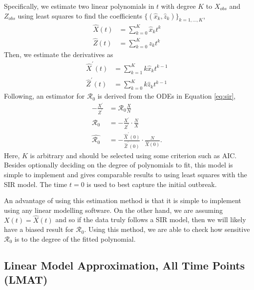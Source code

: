 \documentclass[12pt]{article}
\newcommand{\rr}{\ensuremath{\mathcal{R}_0}}
\begin{document}
Specifically, we estimate two linear polynomials in \(t\) with degree $K$  to \(X_{obs}\)
and \(Z_{obs}\) using least squares to find the coefficients $\{(\hat{x}_k,
\hat{z}_k)\}_{k=1, \dots, K}$,
\begin{align*}
\hat{X}(t) &= \sum_{k=0}^K \hat{x}_k t^k\\
{\hat{Z}}(t) &= \sum_{k=0}^K \hat{z}_k t^k
\end{align*}
Then, we estimate the derivatives as
\begin{align*}
\hat{X}^\prime(t) &= \sum_{k=1}^K k \hat{x}_k t^{k-1}\\
\hat{Z}^\prime(t) &= \sum_{k=0}^K k \hat{z}_k t^{k-1}
\end{align*}
Following,  an estimator for \(\rr\) is derived from the ODEs in Equation \eqref{eq:sir},
\begin{align}
  - \frac{X^\prime}{Z^\prime}&= \rr \frac{X}{N} \nonumber\\
  \rr &=       -\frac{X^\prime}{
        Z^\prime} \cdot \frac{N}{X} \nonumber\\
  \hat{\rr} &= -\frac{\hat{X}^\prime(0)}{ \hat{Z}^\prime(0)} \cdot \frac{N}{\hat{X}(0)}. \nonumber
  \end{align}
  Here, $K$ is arbitrary and should be selected using some criterion such as AIC.  Besides optionally deciding on the degree of polynomials to fit, this model is simple to implement and gives comparable results to using least squares with the SIR model.  The time $t=0$ is used to best capture the initial outbreak.

  An advantage of using this estimation method is that it is simple to implement using any linear modelling software.  On the other hand, we are assuming $X(t) = \hat{X}(t)$ and so if the data truly follows a SIR model, then we will likely have a biased result for $\rr$.  Using this method, we are able to check how sensitive $\rr$ is to the degree of the fitted polynomial.

\subsection{Linear Model Approximation, All Time Points (LMAT)}\label{linear-model-approximation-all-time-points-degree-10}
\end{document}
